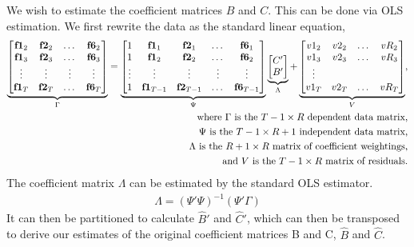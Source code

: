 \documentclass[11pt, letterpaper]{article}
\newcommand{\vv}[1]{\textcolor{black}{\mathbf{#1}}}
\begin{document}
We wish to estimate the coefficient matrices $B$ and $C$. This can be done via OLS estimation. We first rewrite the data as the standard linear equation,
\begin{align*}
\underbrace{\begin{bmatrix}
\vv{f1}_{2} & \vv{f2}_{2} & \dots & \vv{f6}_{2}\\
\vv{f1}_{3} & \vv{f2}_{3} & \dots & \vv{f6}_{3}\\
\vdots & \vdots & \vdots & \vdots \\
\vv{f1}_{T} & \vv{f2}_{T} & \dots & \vv{f6}_{T}
\end{bmatrix}}_{\Gamma}
=
\underbrace{\begin{bmatrix}
1 & \vv{f1}_{1} & \vv{f2}_{1} & \dots & \vv{f6}_{1}\\
1 & \vv{f1}_{2} & \vv{f2}_{2} & \dots & \vv{f6}_{2}\\
\vdots & \vdots & \vdots & \vdots & \vdots \\
1 & \vv{f1}_{T-1} & \vv{f2}_{T-1} & \dots & \vv{f6}_{T-1}
\end{bmatrix}}_{\Psi}
\underbrace{\begin{bmatrix}
C'\\
B'
\end{bmatrix}}_{\Lambda}
 +
\underbrace{\begin{bmatrix}
v1_2 & v2_2 & \dots & vR_2\\
v1_3 & v2_3 & \dots & vR_3\\
\vdots\\
v1_T & v2_T & \dots & vR_T\\
\end{bmatrix}}_{V},\\
\text{where $\Gamma$ is the $T-1 \times R$ dependent data matrix,}\\
\text{$\Psi$ is the $T-1 \times R+1$ independent data matrix,}\\
\text{$\Lambda$ is the $R+1 \times R$ matrix of coefficient weightings,}\\
\text{and $V$ is the $T-1 \times R$ matrix of residuals.}
\end{align*}
The coefficient matrix $\Lambda$ can be estimated by the standard OLS estimator.
\begin{align*}
\widehat{\Lambda} = (\Psi' \Psi)^{-1} (\Psi'\Gamma)
\end{align*}
It can then be partitioned to calculate $\widehat{B}'$ and $\widehat{C}'$, which can then be transposed to derive our estimates of the original coefficient matrices B and C, $\widehat{B}$ and $\widehat{C}$.
\end{document}
